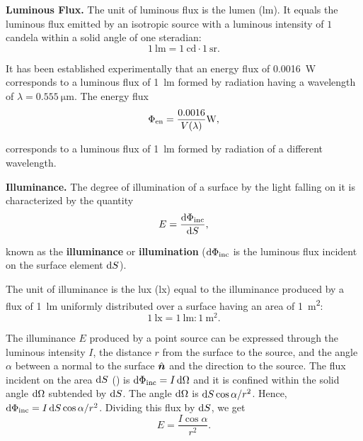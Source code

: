 \textbf{Luminous Flux.}
The unit of luminous flux is the lumen (\si{\lumen}).
It equals the luminous flux emitted by an isotropic source with a luminous intensity of $1$ candela within a solid angle of one steradian:
\begin{equation}\label{eq:16_42}
    \SI{1}{\lumen} = \SI{1}{\candela} \cdot \SI{1}{\steradian}.
\end{equation}

It has been established experimentally that an energy flux of \SI{0.0016}{\watt} corresponds to a luminous flux of \SI{1}{\lumen} formed by radiation
having a wavelength of $\lambda = \SI{0.555}{\micro\metre}$.
The energy flux
\begin{equation}\label{eq:16_43}
    \Phi_{\text{en}} = \frac{0.0016}{V(\lambda)} \si{\watt},
\end{equation}

\noindent
corresponds to a luminous flux of \SI{1}{\lumen} formed by radiation of a different wavelength.

\textbf{Illuminance.}
The degree of illumination of a surface by the light falling on it is characterized by the quantity
\begin{equation}\label{eq:16_44}
    E = \dfrac{\mathrm{d}\Phi_{\text{inc}}}{\mathrm{d} S},
\end{equation}

\noindent
known as the \textbf{illuminance} or \textbf{illumination} ($\mathrm{d}\Phi_{\text{inc}}$ is the luminous flux incident on the surface element $\mathrm{d} S$).

The unit of illuminance is the lux (\si{\lux}) equal to the illuminance produced by a flux of \SI{1}{\lumen} uniformly distributed over a surface
having an area of \SI{1}{\metre\squared}:
\begin{equation}\label{eq:16_45}
    \SI{1}{\lux} = \SI{1}{\lumen} : \SI{1}{\metre\squared}.
\end{equation}

The illuminance $E$ produced by a point source can be expressed through the luminous intensity $I$, the distance $r$ from the surface to the source, and the angle $\alpha$ between a normal to the surface $\hat{\boldsymbol{n}}$ and the direction to the source.
The flux incident on the area $\mathrm{d} S$ () is $\mathrm{d}\Phi_{\text{inc}}=I\, \mathrm{d}\Omega$ and it is confined within the solid angle $\mathrm{d}\Omega$ subtended by $\mathrm{d} S$.
The angle $\mathrm{d}\Omega$ is $\mathrm{d} S\cos\alpha/r^2$.
Hence, $\mathrm{d}\Phi_{\text{inc}}=I\,\mathrm{d} S \cos\alpha/r^2$.
Dividing this flux by $\mathrm{d} S$, we get
\begin{equation}\label{eq:16_46}
    E = \frac{I \cos\alpha}{r^2}.
\end{equation}

